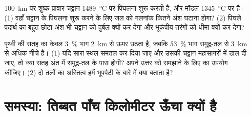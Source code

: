 \begin{exercise}[$\star\star\star$]\label{exo:g11:lithosphere-asthenosphere:14}
\qty{100}{km} पर शुष्क प्रावार-चट्टान \qty{1489}{\celsius} पर पिघलना शुरू करती है,
और मॉडल  \qty{1345}{\celsius} पर है। (1) वहाँ चट्टान के पिघलना शुरू करने के लिए
जल को गलनांक कितने अंश घटाना होगा? (2) पिघले पदार्थ का बहुत छोटा अंश भी
चट्टान को दुर्बल क्यों कर देगा और भूकंपीय तरंगों को धीमा क्यों कर देगा?
\end{exercise}

\begin{exercise}[$\star\star\star$]\label{exo:g11:lithosphere-asthenosphere:15}
पृथ्वी की सतह का केवल \qty{3}{\percent} भाग \qty{2}{km} से ऊपर उठता है, जबकि
\qty{53}{\percent} भाग समुद्र-तल से \qty{3}{km} से अधिक नीचे है। (1) यदि सारा
स्थल समतल कर दिया जाए और उसकी चट्टान महासागरों में डाल दी जाए, तो क्या सतह
अंत में समुद्र-तल के पास होगी? अपने उत्तर को समझाने के लिए  का उपयोग कीजिए। (2)
दो तलों का अस्तित्व हमें भूपर्पटी के बारे में क्या बताता है?
\end{exercise}

\section{समस्या: तिब्बत पाँच किलोमीटर ऊँचा क्यों है}

